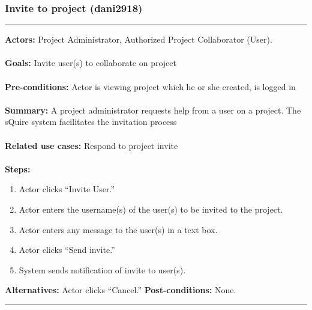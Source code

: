 \documentclass[11pt]{report}
\begin{document}
\subsubsection{Invite to project (dani2918)}
\vspace{2pt}
\hrule
\vspace{8pt}
 \textbf{Actors:} Project Administrator, Authorized Project Collaborator (User).  \\ \\
\textbf{Goals:} Invite user(s) to collaborate on project \\ \\
 \textbf{Pre-conditions:} Actor is viewing project which he or she created, is logged in   \\ \\
\textbf{Summary:} A project administrator requests help from a user on a project. The sQuire system facilitates the invitation process  \\ \\
\textbf{Related use cases:} Respond to project invite\\ \\
\textbf{Steps:} \begin{enumerate}
  \item Actor clicks ``Invite User.''
  \item Actor enters the username(s) of the user(s) to be invited to the project.
  \item Actor enters any message to the user(s) in a text box.
  \item Actor clicks ``Send invite.''
  \item System sends notification of invite to user(s).
 \end{enumerate}
 \textbf{Alternatives:} Actor clicks ``Cancel.''
 \textbf{Post-conditions:} None.  \\
\vspace{8pt}
\hrule
\newpage
\end{document}
